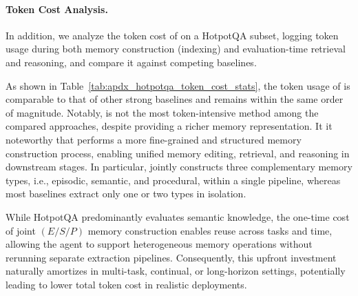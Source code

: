 \paragraph{Token Cost Analysis. }

In addition, we analyze the token cost of \plugmem on a HotpotQA subset, logging token usage during both memory construction (indexing) and evaluation-time retrieval and reasoning, and compare it against competing baselines.

As shown in Table~\ref{tab:apdx_hotpotqa_token_cost_stats}, the token usage of \plugmem is comparable to that of other strong baselines and remains within the same order of magnitude. Notably, \plugmem is not the most token-intensive method among the compared approaches, despite providing a richer memory representation. It it noteworthy that \plugmem performs a more fine-grained and structured memory construction process, enabling unified memory editing, retrieval, and reasoning in downstream stages. In particular, \plugmem jointly constructs three complementary memory types, i.e., episodic, semantic, and procedural, within a single pipeline, whereas most baselines extract only one or two types in isolation.

While HotpotQA predominantly evaluates semantic knowledge, the one-time cost of joint $(E/S/P)$ memory construction enables reuse across tasks and time, allowing the agent to support heterogeneous memory operations without rerunning separate extraction pipelines. Consequently, this upfront investment naturally amortizes in multi-task, continual, or long-horizon settings, potentially leading to lower total token cost in realistic deployments.


\begin{table}[]
\centering
\caption{Token Cost Statistics on HotpotQA. (\~k tokens)}
\label{tab:apdx_hotpotqa_token_cost_stats}
\end{table}


